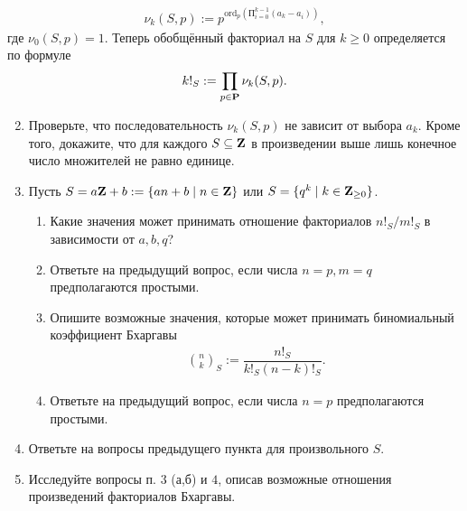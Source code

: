 \begin{align*}
\nu_k(S,p) := p^{\text{ord}_p\left( \text{П}_{i = 0}^{k-1} (a_k - a_i)\right)},
\end{align*}
где $\nu_0(S,p) = 1.$ Теперь обобщённый факториал на $S$ для $k \geq 0$ определяется по формуле
\begin{align*}
k!_S := \prod_{p \in \text{\bf P}} \nu_k(S,p).
\end{align*}
\begin{enumerate} \setcounter{enumi}{1}
\item Проверьте, что последовательность $\nu_k(S,p)$ не зависит от выбора $a_k$. Кроме того, докажите, что для каждого $S \subseteq \text{\bf Z}$ в произведении выше лишь конечное число множителей не равно единице.
\item Пусть $S = a\text{\bf Z} + b := \{an + b \mid n \in \text{\bf Z}\}$ или $S = \{q^k \mid k \in \text{\bf Z}_{\geq 0}\}$. 
\begin{enumerate}
\item Какие значения может принимать отношение факториалов $n!_S/m!_S$ в зависимости от $a,b,q$?
\item Ответьте на предыдущий вопрос, если числа $n = p, m = q$ предполагаются простыми.
\item Опишите возможные значения, которые может принимать биномиальный коэффициент Бхаргавы
\begin{align*}
\binom{n}{k}_S := \dfrac{n!_S}{k!_S (n-k)!_S}.
\end{align*}
\item Ответьте на предыдущий вопрос, если числа $n = p$ предполагаются простыми.
\end{enumerate}

\item Ответьте на вопросы предыдущего пункта для произвольного $S.$

\item Исследуйте вопросы п. $3$ (а,б) и $4$, описав возможные отношения произведений факториалов Бхаргавы.
\end{enumerate}